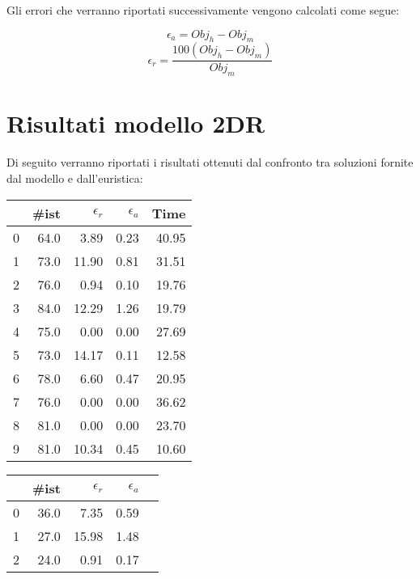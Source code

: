 Gli errori che verranno riportati successivamente vengono calcolati come segue:
\begin{center}
	$$\epsilon_a = Obj_h - Obj_m$$
	$$\epsilon_r = \frac{100 (Obj_h - Obj_m) }{Obj_m}$$
\end{center}

\newpage
\section{Risultati modello 2DR}
Di seguito verranno riportati i risultati ottenuti dal confronto tra soluzioni fornite dal modello e dall'euristica:
\begin{center}
	\begin{table}[H]
		\begin{minipage}{0.4\textwidth}
			\centering
			\begin{tabular}{lrrrr}
				\toprule
				{} & \#ist & $\epsilon_r$ & $\epsilon_a$ & Time  \\
				\midrule
				0  & 64.0  & 3.89         & 0.23         & 40.95 \\
				1  & 73.0  & 11.90        & 0.81         & 31.51 \\
				2  & 76.0  & 0.94         & 0.10         & 19.76 \\
				3  & 84.0  & 12.29        & 1.26         & 19.79 \\
				4  & 75.0  & 0.00         & 0.00         & 27.69 \\
				5  & 73.0  & 14.17        & 0.11         & 12.58 \\
				6  & 78.0  & 6.60         & 0.47         & 20.95 \\
				7  & 76.0  & 0.00         & 0.00         & 36.62 \\
				8  & 81.0  & 0.00         & 0.00         & 23.70 \\
				9  & 81.0  & 10.34        & 0.45         & 10.60 \\
				\bottomrule
			\end{tabular}
		\end{minipage}
		\begin{minipage}{0.5\textwidth}
			\centering
			\begin{tabular}{lrrrr}
				\toprule
				{} & \#ist & $\epsilon_r$ & $\epsilon_a$ \\
				\midrule
				0  & 36.0  & 7.35         & 0.59         \\
				1  & 27.0  & 15.98        & 1.48         \\
				2  & 24.0  & 0.91         & 0.17         \\

\end{tabular}
\end{minipage}
\end{table}
\end{center}
